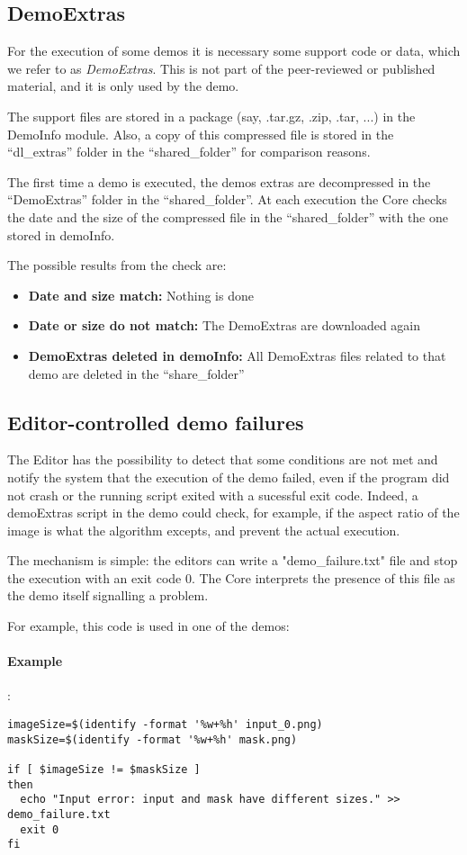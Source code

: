 \subsection{DemoExtras}
\label{demoextras} 
For the execution of some demos it is necessary some support code or data, which we refer to as \emph{DemoExtras}. This is not part of the peer-reviewed or published material, and it is only used by the demo.

The support files are stored in a package (say, .tar.gz, .zip, .tar, ...) in the DemoInfo module. Also, a copy of this compressed file is stored in the ``dl\_extras'' folder in the ``shared\_folder'' for comparison reasons. 

The first time a demo is executed, the demos extras are decompressed in the ``DemoExtras'' folder in the ``shared\_folder''. At each execution the Core checks the date and the size of the compressed file in the ``shared\_folder'' with the one stored in demoInfo. 

The possible results from the check are:
\begin{itemize}
 \item \textbf{Date and size match:} Nothing is done
 \item \textbf{Date or size do not match:} The DemoExtras are downloaded again
 \item \textbf{DemoExtras deleted in demoInfo:} All DemoExtras files related to that demo are deleted in the ``share\_folder''
\end{itemize}

\subsection{Editor-controlled demo failures}
The Editor has the possibility to detect that some conditions are not met and notify the system that the execution of the demo failed, even if the program did not crash or the running script exited with a sucessful exit code. Indeed, a demoExtras script in the demo could check, for example, if the aspect ratio of the image is what the algorithm excepts, and prevent the actual execution.

The mechanism is simple: the editors can write a "demo\_failure.txt" file and stop the execution with an exit
code 0. The Core interprets the presence of this file as the demo itself signalling a problem.

For example, this code is used in one of the demos:
\paragraph{Example}:\\
\begin{verbatim}
imageSize=$(identify -format '%w+%h' input_0.png)
maskSize=$(identify -format '%w+%h' mask.png)

if [ $imageSize != $maskSize ]
then
  echo "Input error: input and mask have different sizes." >> demo_failure.txt
  exit 0
fi
\end{verbatim} 
